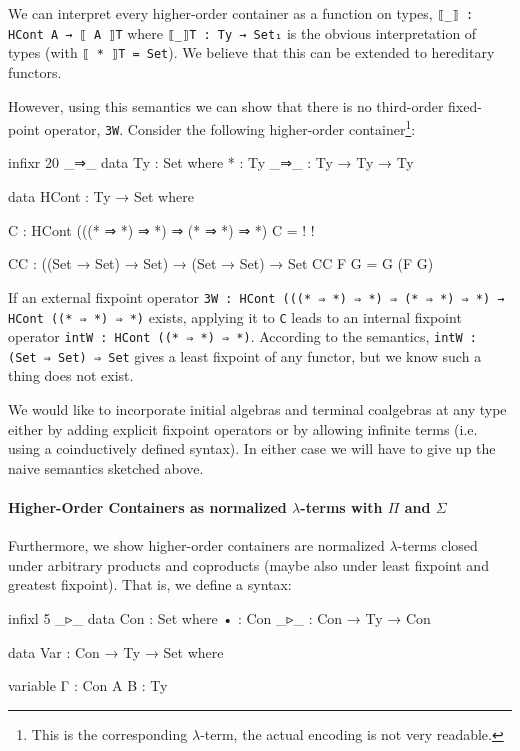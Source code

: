 \documentclass{easychair}
\begin{document}
We can interpret every higher-order container as a function on types, \texttt{⟦\_⟧ :
HCont A → ⟦ A ⟧T} where \texttt{⟦\_⟧T  : Ty → Set₁} is the obvious
interpretation of types (with \texttt{⟦ * ⟧T = Set}). We believe that this can
be extended to hereditary functors.

However, using this semantics
we can show that there is no third-order fixed-point operator, \texttt{3W}.
Consider the following higher-order container\footnote{This is the corresponding 
$\lambda$-term, the actual encoding is not very readable.}:

\begin{code}[hide]
infixr 20 _⇒_
data Ty : Set where
  * : Ty
  _⇒_ : Ty → Ty → Ty

data HCont : Ty → Set where
\end{code}

\begin{code}
C : HCont (((* ⇒ *) ⇒ *) ⇒ (* ⇒ *) ⇒ *)
C = {!   !}

CC : ((Set → Set) → Set) → (Set → Set) → Set
CC F G = G (F G)
\end{code}

\noindent
If an external fixpoint operator \texttt{3W : HCont (((* ⇒ *) ⇒ *) ⇒ (* ⇒ *) ⇒ *) → HCont ((* ⇒ *) ⇒ *)}
exists, applying it to \texttt{C} leads to an internal fixpoint operator \texttt{intW : HCont ((* ⇒ *) ⇒ *)}.
According to the semantics, \texttt{intW : (Set ⇒ Set) ⇒ Set} gives a least fixpoint of any functor, but we know such a thing does not
exist.

We would like to incorporate initial algebras and terminal coalgebras
at any type either by adding explicit fixpoint operators or by
allowing infinite terms (i.e. using a coinductively defined syntax).
In either case we will have to give up the naive semantics sketched
above. 

\paragraph{Higher-Order Containers as normalized $\lambda$-terms with $\Pi$ and $\Sigma$} 
Furthermore, we show higher-order containers are normalized $\lambda$-terms
closed under arbitrary products and coproducts (maybe also under least fixpoint and
greatest fixpoint). That is, we define a syntax:

\begin{code}[hide]
infixl 5 _▹_
data Con : Set where
  •   : Con
  _▹_ : Con → Ty → Con

data Var : Con → Ty → Set where

variable
  Γ : Con
  A B : Ty
\end{code}
\end{document}

